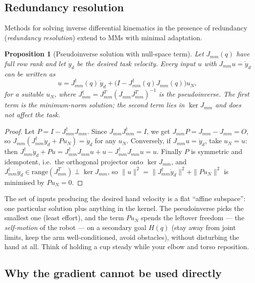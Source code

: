 \documentclass[11pt,a4paper]{article}
\def\bm#1{#1}%
\newcommand{\Jmm}{\bm{J}_{mm}}
\theoremstyle{definition}
\theoremstyle{plain}
\newtheorem{proposition}[definition]{Proposition}
\theoremstyle{remark}
\begin{document}
\subsection{Redundancy resolution}

Methods for solving inverse differential kinematics in the presence of redundancy (\emph{redundancy resolution}) extend to MMs with minimal adaptation.

\begin{proposition}[Pseudoinverse solution with null-space term]\label{prop:ik}
Let $\Jmm(\bm q)$ have full row rank and let $\dot{\bm y}_d$ be the desired task velocity. Every input $\bm u$ with $\Jmm\bm u=\dot{\bm y}_d$ can be written as
\[
\bm u=\Jmm^\dagger(\bm q)\,\dot{\bm y}_d+\bigl(\bm I-\Jmm^\dagger(\bm q)\Jmm(\bm q)\bigr)\bm u_N ,
\]
for a suitable $\bm u_N$, where $\Jmm^\dagger=\Jmm^T(\Jmm\Jmm^T)^{-1}$ is the pseudoinverse. The first term is the minimum-norm solution; the second term lies in $\ker\Jmm$ and does not affect the task.
\end{proposition}

\begin{proof}
Let $\bm P=\bm I-\Jmm^\dagger\Jmm$. Since $\Jmm\Jmm^\dagger=\bm I$, we get $\Jmm\bm P=\Jmm-\Jmm=\bm O$, so $\Jmm(\Jmm^\dagger\dot{\bm y}_d+\bm P\bm u_N)=\dot{\bm y}_d$ for any $\bm u_N$. Conversely, if $\Jmm\bm u=\dot{\bm y}_d$, take $\bm u_N=\bm u$: then $\Jmm^\dagger\dot{\bm y}_d+\bm P\bm u=\Jmm^\dagger\Jmm\bm u+\bm u-\Jmm^\dagger\Jmm\bm u=\bm u$. Finally $\bm P$ is symmetric and idempotent, i.e.\ the orthogonal projector onto $\ker\Jmm$, and $\Jmm^\dagger\dot{\bm y}_d\in\mathrm{range}(\Jmm^T)\perp\ker\Jmm$, so $\|\bm u\|^2=\|\Jmm^\dagger\dot{\bm y}_d\|^2+\|\bm P\bm u_N\|^2$ is minimised by $\bm P\bm u_N=\bm 0$.
\end{proof}

\begin{intuition}
The set of inputs producing the desired hand velocity is a flat ``affine subspace'': one particular solution plus anything in the kernel. The pseudoinverse picks the smallest one (least effort), and the term $\bm P\bm u_N$ spends the leftover freedom --- the \emph{self-motion} of the robot --- on a secondary goal $H(\bm q)$ (stay away from joint limits, keep the arm well-conditioned, avoid obstacles), without disturbing the hand at all. Think of holding a cup steady while your elbow and torso reposition.
\end{intuition}

\subsection{Why the gradient cannot be used directly}
\end{document}
